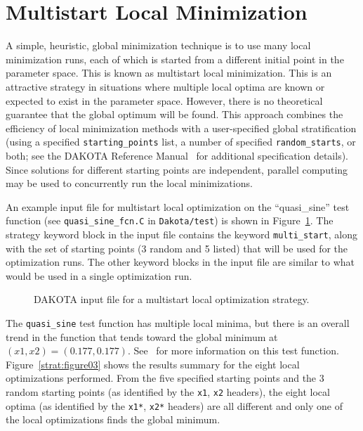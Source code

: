\section{Multistart Local Minimization}\label{strat:multistart}

A simple, heuristic, global minimization technique is to use many
local minimization runs, each of which is started from a different
initial point in the parameter space. This is known as multistart
local minimization. This is an attractive strategy in situations where
multiple local optima are known or expected to exist in the parameter
space. However, there is no theoretical guarantee that the global
optimum will be found. This approach combines the efficiency of local
minimization methods with a user-specified global stratification
(using a specified \texttt{starting\_points} list, a number of
specified \texttt{random\_starts}, or both; see the DAKOTA Reference
Manual~\cite{RefMan} for additional specification details). Since
solutions for different starting points are independent, parallel
computing may be used to concurrently run the local minimizations.

An example input file for multistart local optimization on the
``quasi\_sine'' test function (see \texttt{quasi\_sine\_fcn.C} in
\texttt{Dakota/test}) is shown in Figure~\ref{strat:figure02}. The
strategy keyword block in the input file contains the keyword
\texttt{multi\_start}, along with the set of starting points (3 random 
and 5 listed) that will be used for the optimization runs. The other
keyword blocks in the input file are similar to what would be used in
a single optimization run.

\begin{figure}
  \centering
  \begin{bigbox}
    \begin{small}
    \end{small}
  \end{bigbox}
  \caption{DAKOTA input file for a multistart local optimization strategy.}
  \label{strat:figure02}
\end{figure}

The \texttt{quasi\_sine} test function has multiple local minima, but
there is an overall trend in the function that tends toward the global
minimum at $(x1,x2)=(0.177,0.177)$. See~\cite{Giu00} for more
information on this test function. Figure~\ref{strat:figure03} shows
the results summary for the eight local optimizations performed. From
the five specified starting points and the 3 random starting points
(as identified by the \texttt{x1}, \texttt{x2} headers), the eight
local optima (as identified by the \texttt{x1*},
\texttt{x2*} headers) are all different and only one of the local
optimizations finds the global minimum.

